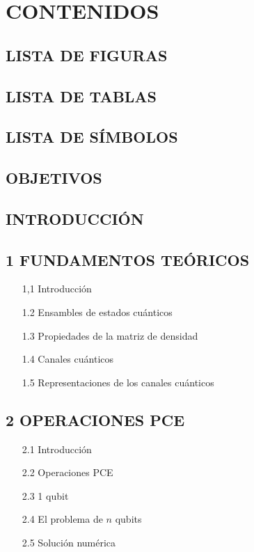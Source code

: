 \chapter{CONTENIDOS}

\section*{LISTA DE FIGURAS}

\section*{LISTA DE TABLAS}

\section*{LISTA DE SÍMBOLOS}

\section*{OBJETIVOS}

\section*{INTRODUCCIÓN}

\section*{1 FUNDAMENTOS TEÓRICOS}
\begin{itemize}
\item[1,1] Introducción
\item[1.2] Ensambles de estados cuánticos
\item[1.3] Propiedades de la matriz de densidad
\item[1.4] Canales cuánticos 
\item[1.5] Representaciones de los canales cuánticos
\end{itemize}

\section*{2 OPERACIONES PCE}
\begin{itemize}
\item[2.1] Introducción
\item[2.2] Operaciones PCE
\item[2.3] 1 qubit
\item[2.4] El problema de $n$ qubits
\item[2.5] Solución numérica
\end{itemize}

